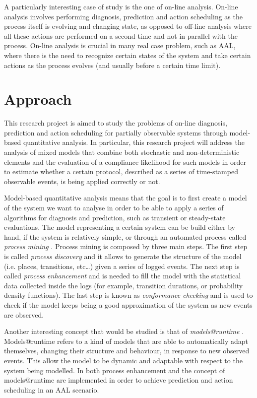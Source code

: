 \documentclass{article}
\begin{document}
        A particularly interesting case of study is the one of on-line analysis. On-line analysis involves performing diagnosis, prediction and action scheduling as the process itself is evolving and changing state, as opposed to off-line analysis where all these actions are performed on a second time and not in parallel with the process. On-line analysis is crucial in many real case problem, such as AAL, where there is the need to recognize certain states of the system and take certain actions as the process evolves (and usually before a certain time limit).
    
    \section*{Approach}
        
        This research project is aimed to study the problems of on-line diagnosis, prediction and action scheduling for partially observable systems through model-based quantitative analysis. In particular, this research project will address the analysis of mixed models that combine both stochastic and non-deterministic elements and the evaluation of a compliance likelihood for such models in order to estimate whether a certain protocol, described as a series of time-stamped observable events, is being applied correctly or not.
        
        Model-based quantitative analysis means that the goal is to first create a model of the system we want to analyse in order to be able to apply a series of algorithms for diagnosis and prediction, such as transient or steady-state evaluations. The model representing a certain system can be build either by hand, if the system is relatively simple, or through an automated process called \textit{process mining} \cite{van2004workflow}. Process mining is composed by three main steps. The first step is called \textit{process discovery} and it allows to generate the structure of the model (i.e. places, transitions, etc\dots) given a series of logged events. The next step is called \textit{process enhancement} and is needed to fill the model with the statistical data collected inside the logs (for example, transition durations, or probability density functions). The last step is known as \textit{conformance checking} and is used to check if the model keeps being a good approximation of the system as new events are observed.
        
        Another interesting concept that would be studied is that of \textit{models@runtime} \cite{blair2009models}. Models@runtime refers to a kind of models that are able to automatically adapt themselves, changing their structure and behaviour, in response to new observed events. This allow the model to be dynamic and adaptable with respect to the system being modelled. In \cite{epew16} both process enhancement and the concept of models@runtime are implemented in order to achieve prediction and action scheduling in an AAL scenario.
        
\end{document}
